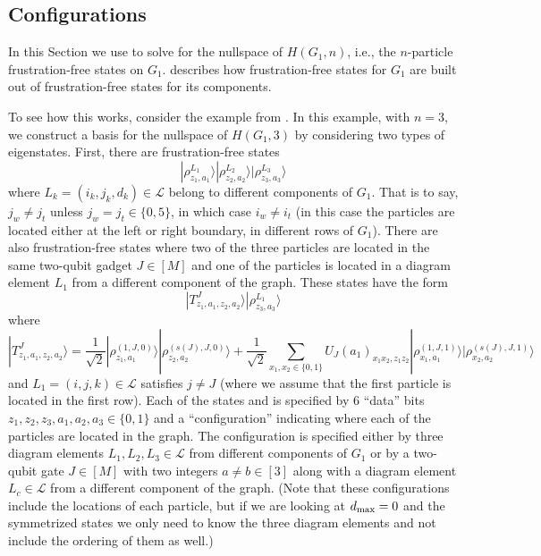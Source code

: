 \documentclass[../thesis-main/thesis-main]{subfiles}
\begin{document}
\subsection{Configurations}

In this Section we use  to solve for the nullspace of $H(G_{1},n)$, i.e., the $n$-particle frustration-free states on $G_{1}$.  describes how frustration-free states for $G_1$ are built out of frustration-free states for its components.

To see how this works, consider the example from . In this example, with $n=3$, we construct a basis for the nullspace of $H(G_{1},3)$ by considering two types of eigenstates. First, there are frustration-free states
\begin{equation}
  |\rho_{z_{1},a_{1}}^{L_{1}}\rangle|\rho_{z_{2},a_{2}}^{L_{2}}\rangle|\rho_{z_{3},a_{3}}^{L_{3}}\rangle
\label{eq:twopart_states1}
\end{equation}
where $L_{k}=(i_{k},j_{k},d_{k})\in\mathcal{L}$ belong to different components of $G_{1}$. That is to say, $j_{w}\neq j_{t}$ unless $j_{w}=j_{t}\in\{0,5\}$, in which case $i_{w}\neq i_{t}$ (in this case the particles are located either at the left or right boundary, in different rows of $G_{1}$). There are also frustration-free states where two of the three particles are located in the same two-qubit gadget $J\in[M]$ and one of the particles is located in a diagram element $L_{1}$ from a different component of the graph. These states have the form
\begin{equation}
  |T_{z_{1},a_{1},z_{2},a_{2}}^{J}\rangle|\rho_{z_{3},a_{3}}^{L_{1}}\rangle
\label{eq:twopart_states2}
\end{equation}
where 
\begin{equation}
|T_{z_{1},a_{1},z_{2},a_{2}}^{J}\rangle=\frac{1}{\sqrt{2}}|\rho_{z_{1},a_{1}}^{(1,J,0)}\rangle|\rho_{z_{2},a_{2}}^{(s(J),J,0)}\rangle+\frac{1}{\sqrt{2}}\sum_{x_{1},x_{2}\in\{0,1\}}U_{J}(a_{1})_{x_{1}x_{2},z_{1}z_{2}}|\rho_{x_{1},a_{1}}^{(1,J,1)}\rangle|\rho_{x_{2},a_{2}}^{(s(J),J,1)}\rangle\label{eq:T_state}
\end{equation}
and $L_{1}=(i,j,k)\in\mathcal{L}$ satisfies $j\neq J$ (where we assume that the first particle is located in the first row). Each of the states  and  is specified by $6$ ``data'' bits $z_{1},z_{2},z_{3},a_{1},a_{2},a_{3}\in\{0,1\}$ and a ``configuration'' indicating where each of the particles are located in the graph. The configuration is specified either by three diagram elements $L_{1},L_{2},L_{3}\in\mathcal{L}$ from different components of $G_{1}$ or by a two-qubit gate $J\in [M]$ with two integers $a\neq b\in[3]$ along with a diagram element $L_{c}\in\mathcal{L}$ from a different component of the graph.  (Note that these configurations include the locations of each particle, but if we are looking at $d_{\text{max}} = 0$ and the symmetrized states we only need to know the three diagram elements and not include the ordering of them as well.)
\end{document}

